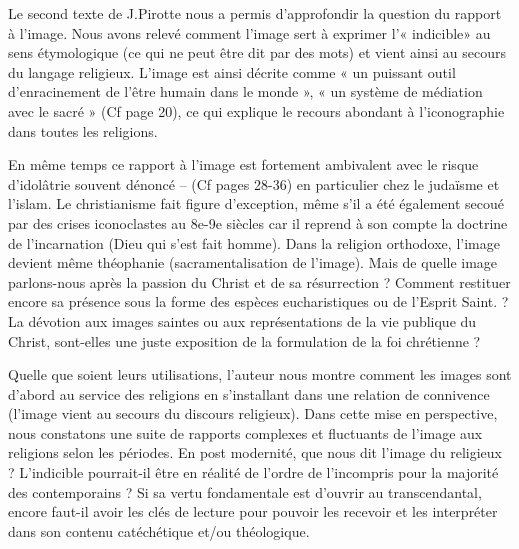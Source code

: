  

Le second texte de J.Pirotte nous a permis d’approfondir la question du rapport à l’image. Nous avons relevé comment l'image sert à exprimer l’« indicible» au sens étymologique (ce qui ne peut être dit par des mots) et vient ainsi au secours du langage religieux. L’image est ainsi décrite comme « un puissant outil d'enracinement de l'être humain dans le monde », « un système de médiation avec le sacré » (Cf page 20), ce qui explique le recours abondant à l’iconographie dans toutes les religions.
 



En même temps ce rapport à l’image est fortement ambivalent avec le risque d’idolâtrie souvent dénoncé – (Cf pages 28-36) en particulier chez le judaïsme et l’islam. Le christianisme fait figure d’exception, même s’il a été également secoué par des crises iconoclastes au 8e-9e siècles car il reprend à son compte la doctrine de l’incarnation (Dieu qui s’est fait homme). Dans la religion orthodoxe, l’image devient même théophanie (sacramentalisation de l’image). Mais de quelle image parlons-nous après la passion du Christ et de sa résurrection ? Comment restituer encore sa présence sous la forme des espèces eucharistiques ou de l’Esprit Saint. ? La dévotion aux images saintes ou aux représentations de la vie publique du Christ, sont-elles une juste exposition de la formulation de la foi chrétienne ?

Quelle que soient leurs utilisations, l’auteur nous montre comment les images sont d’abord au service des religions en s’installant dans une relation de connivence (l’image vient au secours du discours religieux). Dans cette mise en perspective, nous constatons une suite de rapports complexes et fluctuants de l’image aux religions selon les périodes. En post modernité, que nous dit l’image du religieux ? L’indicible pourrait-il être en réalité de l’ordre de l’incompris pour la majorité des contemporains ? Si sa vertu fondamentale est d’ouvrir au transcendantal, encore faut-il avoir les clés de lecture pour pouvoir les recevoir et les interpréter dans son contenu catéchétique et/ou théologique.
